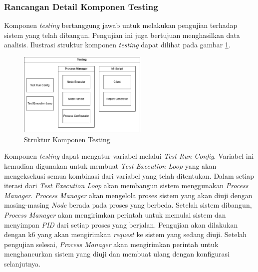 \subsubsection{Rancangan Detail Komponen Testing}
\label{subsubsection:detail-data-testing}

Komponen \textit{testing} bertanggung jawab untuk melakukan pengujian terhadap sistem yang telah dibangun. Pengujian ini juga bertujuan menghasilkan data analisis. Ilustrasi struktur komponen \textit{testing} dapat dilihat pada gambar \ref{fig:testing-structure}.

\begin{figure}[ht]
    \centering
    \includegraphics[width=0.55\textwidth]{resources/chapter-3/testing-architecture.png}
    \caption{Struktur Komponen Testing}
    \label{fig:testing-structure}
\end{figure}

Komponen \textit{testing} dapat mengatur variabel melalui \textit{Test Run Config}. Variabel ini kemudian digunakan untuk membuat \textit{Test Execution Loop} yang akan mengeksekusi semua kombinasi dari variabel yang telah ditentukan. Dalam setiap iterasi dari \textit{Test Execution Loop} akan membangun sistem menggunakan \textit{Process Manager}. \textit{Process Manager} akan mengelola proses sistem yang akan diuji dengan masing-masing \textit{Node} berada pada proses yang berbeda. Setelah sistem dibangun, \textit{Process Manager} akan mengirimkan perintah untuk memulai sistem dan menyimpan \textit{PID} dari setiap proses yang berjalan. Pengujian akan dilakukan dengan k6 yang akan mengirimkan \textit{request} ke sistem yang sedang diuji. Setelah pengujian selesai, \textit{Process Manager} akan mengirimkan perintah untuk menghancurkan sistem yang diuji dan membuat ulang dengan konfigurasi selanjutnya.